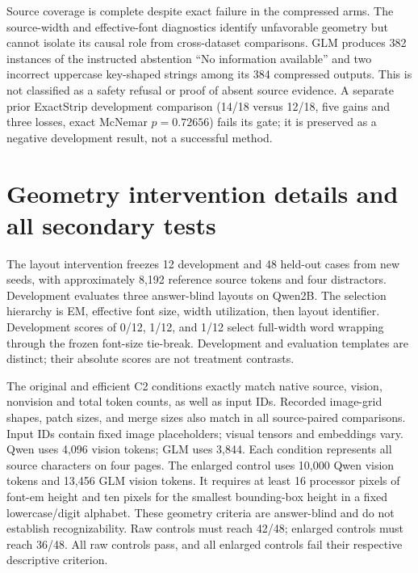 \begin{table}[ht]\centering\small
\caption{Complete original identifier EM counts, each out of 96. The \texttt{p2/p4} suffix identifies the number of pages. Nonzero $C=0.8$ performance is retained and is not included in the claim of zero recovery over compressed arms.}

\end{table}

Source coverage is complete despite exact failure in the compressed arms. The source-width and effective-font diagnostics identify unfavorable geometry but cannot isolate its causal role from cross-dataset comparisons. GLM produces 382 instances of the instructed abstention ``No information available'' and two incorrect uppercase key-shaped strings among its 384 compressed outputs. This is not classified as a safety refusal or proof of absent source evidence. A separate prior ExactStrip development comparison (14/18 versus 12/18, five gains and three losses, exact McNemar $p=0.72656$) fails its gate; it is preserved as a negative development result, not a successful method.

\section{Geometry intervention details and all secondary tests}
\label{app:geometry}
The layout intervention freezes 12 development and 48 held-out cases from new seeds, with approximately 8,192 reference source tokens and four distractors. Development evaluates three answer-blind layouts on Qwen2B. The selection hierarchy is EM, effective font size, width utilization, then layout identifier. Development scores of 0/12, 1/12, and 1/12 select full-width word wrapping through the frozen font-size tie-break. Development and evaluation templates are distinct; their absolute scores are not treatment contrasts.

\begin{table}[ht]\centering
\caption{All layout-intervention conditions, exact correct out of 48.}

\end{table}

The original and efficient C2 conditions exactly match native source, vision, nonvision and total token counts, as well as input IDs. Recorded image-grid shapes, patch sizes, and merge sizes also match in all  source-paired comparisons. Input IDs contain fixed image placeholders; visual tensors and embeddings vary. Qwen uses 4,096 vision tokens; GLM uses 3,844. Each condition represents all source characters on four pages. The enlarged control uses 10,000 Qwen vision tokens and 13,456 GLM vision tokens. It requires at least 16 processor pixels of font-em height and ten pixels for the smallest bounding-box height in a fixed lowercase/digit alphabet. These geometry criteria are answer-blind and do not establish recognizability. Raw controls must reach 42/48; enlarged controls must reach 36/48. All raw controls pass, and all enlarged controls fail their respective descriptive criterion.

